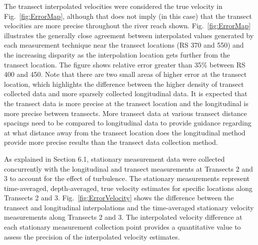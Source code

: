 \documentclass[Journal,letterpaper,BackFigs]{ascelike-new}
\begin{document}
The transect interpolated velocities were considered the true velocity in Fig.~\ref{fig:ErrorMap}, although that does not imply (in this case) that the transect velocities are more precise throughout the river reach shown.  Fig.~\ref{fig:ErrorMap} illustrates the generally close agreement between interpolated values generated by each measurement technique near the transect locations (RS 370 and 550) and the increasing disparity as the interpolation location gets further from the transect location. The figure shows relative error greater than 35\% between RS 400 and 450. Note that there are two small areas of higher error at the transect location, which highlights the difference between the higher density of transect collected data and more sparsely collected longitudinal data. It is expected that the transect data is more precise at the transect location and the longitudinal is more precise between transects. More transect data at various transect distance spacings need to be compared to longitudinal data to provide guidance regarding at what distance away from the transect location does the longitudinal method provide more precise results than the transect data collection method.

As explained in Section 6.1, stationary measurement data were collected concurrently with the longitudinal and transect measurements at Transects 2 and 3 to account for the effect of turbulence. The stationary measurements represent time-averaged, depth-averaged, true velocity estimates for specific locations along Transects 2 and 3. Fig.~\ref{fig:ErrorVelocity} shows the difference between the transect and longitudinal interpolations and the time-averaged stationary velocity measurements along Transects 2 and 3. The interpolated velocity difference at each stationary measurement collection point provides a quantitative value to assess the precision of the interpolated velocity estimates.
\end{document}

